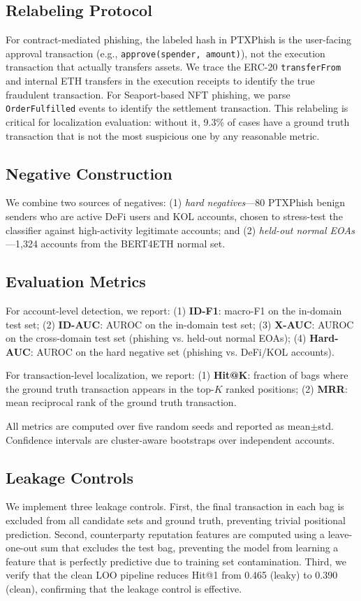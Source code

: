 \documentclass[conference]{IEEEtran}
\begin{document}
\subsection{Relabeling Protocol}
For contract-mediated phishing, the labeled hash in PTXPhish is the user-facing approval transaction (e.g., \texttt{approve(spender, amount)}), not the execution transaction that actually transfers assets. We trace the ERC-20 \texttt{transferFrom} and internal ETH transfers in the execution receipts to identify the true fraudulent transaction. For Seaport-based NFT phishing, we parse \texttt{OrderFulfilled} events to identify the settlement transaction. This relabeling is critical for localization evaluation: without it, 9.3\% of cases have a ground truth transaction that is not the most suspicious one by any reasonable metric.

\subsection{Negative Construction}
We combine two sources of negatives: (1) \emph{hard negatives}---80 PTXPhish benign senders who are active DeFi users and KOL accounts, chosen to stress-test the classifier against high-activity legitimate accounts; and (2) \emph{held-out normal EOAs}---1,324 accounts from the BERT4ETH normal set.

\subsection{Evaluation Metrics}
For account-level detection, we report: (1) \textbf{ID-F1}: macro-F1 on the in-domain test set; (2) \textbf{ID-AUC}: AUROC on the in-domain test set; (3) \textbf{X-AUC}: AUROC on the cross-domain test set (phishing vs. held-out normal EOAs); (4) \textbf{Hard-AUC}: AUROC on the hard negative set (phishing vs. DeFi/KOL accounts).

For transaction-level localization, we report: (1) \textbf{Hit@K}: fraction of bags where the ground truth transaction appears in the top-$K$ ranked positions; (2) \textbf{MRR}: mean reciprocal rank of the ground truth transaction.

All metrics are computed over five random seeds and reported as mean$\pm$std. Confidence intervals are cluster-aware bootstraps over independent accounts.

\subsection{Leakage Controls}
We implement three leakage controls. First, the final transaction in each bag is excluded from all candidate sets and ground truth, preventing trivial positional prediction. Second, counterparty reputation features are computed using a leave-one-out sum that excludes the test bag, preventing the model from learning a feature that is perfectly predictive due to training set contamination. Third, we verify that the clean LOO pipeline reduces Hit@1 from 0.465 (leaky) to 0.390 (clean), confirming that the leakage control is effective.
\end{document}
